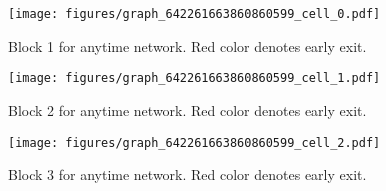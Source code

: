 \documentclass{article} %
\begin{document}
\begin{figure}[h]
\begin{center}
\texttt{[image: figures/graph\_642261663860860599\_cell\_0.pdf]}
\end{center}
\caption{Block 1 for anytime network. Red color denotes early exit.}
\label{fig:best_anytime1}
\end{figure}\begin{figure}[h]
\begin{center}
\texttt{[image: figures/graph\_642261663860860599\_cell\_1.pdf]}
\caption{Block 2 for anytime network. Red color denotes early exit.}
\label{fig:best_anytime2}
\end{center}
\end{figure}\begin{figure}[h]
\begin{center}
\texttt{[image: figures/graph\_642261663860860599\_cell\_2.pdf]}
\caption{Block 3 for anytime network. Red color denotes early exit.}
\label{fig:best_anytime3}
\end{center}
\end{figure}%
\end{document}
